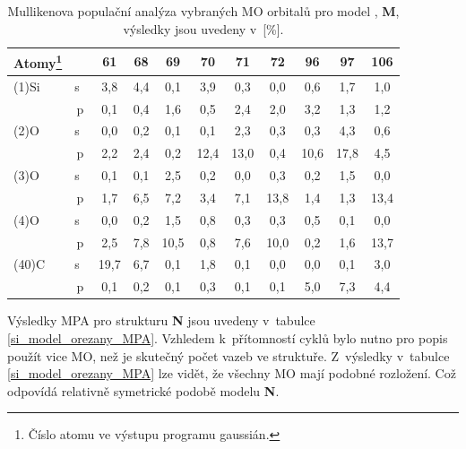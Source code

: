 \documentclass[
digital, %
table,   %
lof,     %
lot,     %
oneside,
]{fithesis3}
\begin{document}
\begin{table}[H]\begin{minipage}{\textwidth}
\caption{Mullikenova populační analýza vybraných MO orbitalů pro model , \textbf{M}, výsledky jsou uvedeny v~[\%].}
\begin{center}
\begin{tabular}{|l|c|c|c|c|c|c|c|c|c|c|}
\hline
Atomy\footnote{Číslo atomu ve výstupu programu gaussián.}   \label{si_model_methyl_MPA_I}  &  & 61 & 68 & 69 & 70 & 71 & 72 & 96 & 97 & 106 \\ \hline
(1)Si  & s~& 3,8  & 4,4 &  0,1  & 3,9  & 0,3  & 0,0  & 0,6  & 1,7  & 1,0  \\ \hline
& p & 0,1  & 0,4& 1,6  & 0,5  & 2,4  & 2,0  & 3,2  & 1,3  & 1,2  \\ \hline
(2)O & s~& 0,0  & 0,2& 0,1  & 0,1  & 2,3  & 0,3  & 0,3  & 4,3  & 0,6  \\ \hline
& p & 2,2  & 2,4& 0,2  & 12,4  & 13,0  & 0,4  & 10,6  & 17,8  & 4,5  \\ \hline
(3)O & s~& 0,1  & 0,1& 2,5  & 0,2  & 0,0  & 0,3  & 0,2  & 1,5  & 0,0  \\ \hline
& p & 1,7  & 6,5 &7,2  & 3,4  & 7,1  & 13,8  & 1,4  & 1,3  & 13,4  \\ \hline
(4)O & s~& 0,0  & 0,2& 1,5  & 0,8  & 0,3  & 0,3  & 0,5  & 0,1  & 0,0  \\ \hline
& p & 2,5  & 7,8& 10,5  & 0,8  & 7,6  & 10,0  & 0,2  & 1,6  & 13,7  \\ \hline
(40)C & s~& 19,7  & 6,7& 0,1  & 1,8  & 0,1  & 0,0  & 0,0  & 0,1  & 3,0  \\ \hline
& p & 0,1  & 0,2& 0,1  & 0,3  & 0,1  & 0,1  & 5,0  & 7,3  & 4,4  \\ \hline
\end{tabular}
\end{center}\end{minipage}\end{table}

Výsledky MPA pro strukturu \textbf{N} jsou uvedeny v~tabulce \ref{si_model_orezany_MPA}. Vzhledem k~přítomností cyklů bylo nutno pro popis použít vice MO, než je skutečný počet vazeb ve struktuře. Z~výsledky v~tabulce \ref{si_model_orezany_MPA} lze vidět, že všechny MO mají podobné rozložení. Což odpovídá relativně symetrické podobě modelu \textbf{N}.
\end{document}
